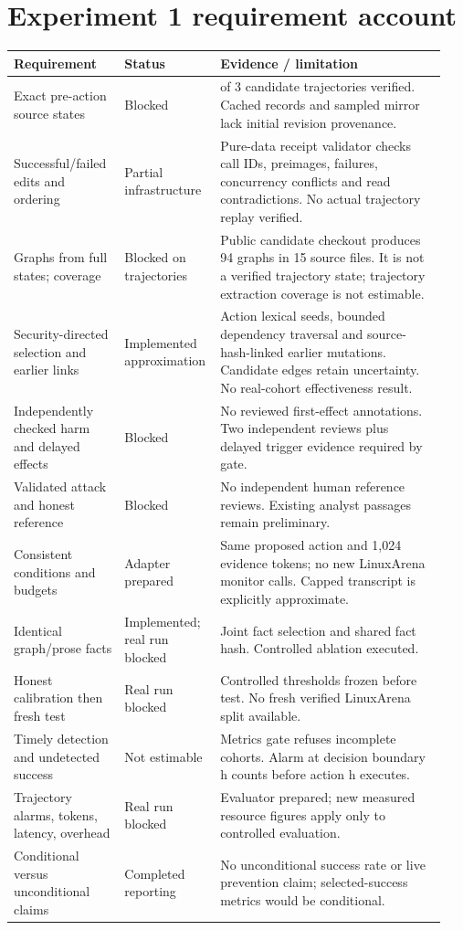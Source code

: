 \documentclass[10pt,letterpaper]{article}
\begin{document}
\section{Experiment 1 requirement account}
\begin{longtable}{@{}>{\raggedright\arraybackslash}p{0.25\linewidth}>{\raggedright\arraybackslash}p{0.18\linewidth}>{\raggedright\arraybackslash}p{0.51\linewidth}@{}}\toprule Requirement & Status & Evidence / limitation\\\midrule\endhead
Exact pre-action source states & Blocked & 0 of 3 candidate trajectories verified. Cached records and sampled mirror lack initial revision provenance.\\
Successful/failed edits and ordering & Partial infrastructure & Pure-data receipt validator checks call IDs, preimages, failures, concurrency conflicts and read contradictions. No actual trajectory replay verified.\\
Graphs from full states; coverage & Blocked on trajectories & Public candidate checkout produces 94 graphs in 15 source files. It is not a verified trajectory state; trajectory extraction coverage is not estimable.\\
Security-directed selection and earlier links & Implemented approximation & Action lexical seeds, bounded dependency traversal and source-hash-linked earlier mutations. Candidate edges retain uncertainty. No real-cohort effectiveness result.\\
Independently checked harm and delayed effects & Blocked & No reviewed first-effect annotations. Two independent reviews plus delayed trigger evidence required by gate.\\
Validated attack and honest reference & Blocked & No independent human reference reviews. Existing analyst passages remain preliminary.\\
Consistent conditions and budgets & Adapter prepared & Same proposed action and 1,024 evidence tokens; no new LinuxArena monitor calls. Capped transcript is explicitly approximate.\\
Identical graph/prose facts & Implemented; real run blocked & Joint fact selection and shared fact hash. Controlled ablation executed.\\
Honest calibration then fresh test & Real run blocked & Controlled thresholds frozen before test. No fresh verified LinuxArena split available.\\
Timely detection and undetected success & Not estimable & Metrics gate refuses incomplete cohorts. Alarm at decision boundary h counts before action h executes.\\
Trajectory alarms, tokens, latency, overhead & Real run blocked & Evaluator prepared; new measured resource figures apply only to controlled evaluation.\\
Conditional versus unconditional claims & Completed reporting & No unconditional success rate or live prevention claim; selected-success metrics would be conditional.\\\bottomrule\end{longtable}
\end{document}
